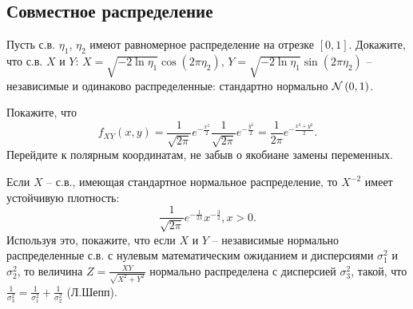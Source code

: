 \subsection{Совместное распределение}

\begin{problem}
Пусть с.в. $\eta _{1} $, $\eta _{2} $ имеют равномерное распределение на отрезке $\left[0,1\right]$. Докажите, что с.в. $X$ и $Y$: $X=\sqrt{-2\ln \eta _{1} } \cos \left(2\pi \eta _{2} \right)$, $Y=\sqrt{-2\ln \eta _{1} } \sin \left(2\pi \eta _{2} \right)$ -- независимые и одинаково распределенные: стандартно нормально ${\rm {\mathcal N}}\left(0,1\right)$.

\begin{ordre}
Покажите, что
\[f_{XY} (x,y)=\frac{1}{\sqrt{2\pi } } e^{-\frac{x^{2} }{2} } \frac{1}{\sqrt{2\pi } } e^{-\frac{y^{2} }{2} } =\frac{1}{2\pi } e^{-\frac{x^{2} +y^{2} }{2} } .\] 
Перейдите к полярным координатам, не забыв о якобиане замены переменных.
\end{ordre}

\end{problem}

\begin{problem}

Если $X$ -- с.в., имеющая стандартное нормальное распределение, то $X^{-2} $ имеет устойчивую плотность:
\[\frac{1}{\sqrt{2\pi } } e^{-\frac{1}{2x} } x^{-\frac{3}{2} } , x>0.\] 
Используя это, покажите, что если $X$ и $Y$ -- независимые нормально распределенные с.в. с нулевым математическим ожиданием и дисперсиями $\sigma _{1}^{2} $ и $\sigma _{2}^{2} $, то величина $Z=\frac{XY}{\sqrt{X^{2} +Y^{2} } } $ нормально распределена с дисперсией $\sigma _{3}^{2} $, такой, что $\frac{1}{\sigma _{3}^{2} } =\frac{1}{\sigma _{1}^{2} } +\frac{1}{\sigma _{2}^{2} } $ (Л.Шепп).

\end{problem}